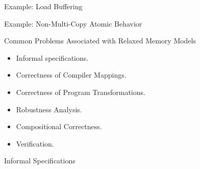 \documentclass[notes, xcolor = dvipsnames]{beamer}
\begin{document}
    \begin{frame}{Example: Load Buffering}
        
    \end{frame}

    \begin{frame}{Example: Non-Multi-Copy Atomic Behavior}
        
    \end{frame}



    \begin{frame}{Common Problems Associated with Relaxed Memory Models}
        
        \begin{itemize}
            \item Informal specifications.
            \item Correctness of Compiler Mappings.
            \item Correctness of Program Transformations.
            \item Robustness Analysis.
            \item Compositional Correctness.
            \item Verification. 
        \end{itemize}
        

    \end{frame}

    \begin{frame}{Informal Specifications}
        
    \end{frame}
\end{document}
